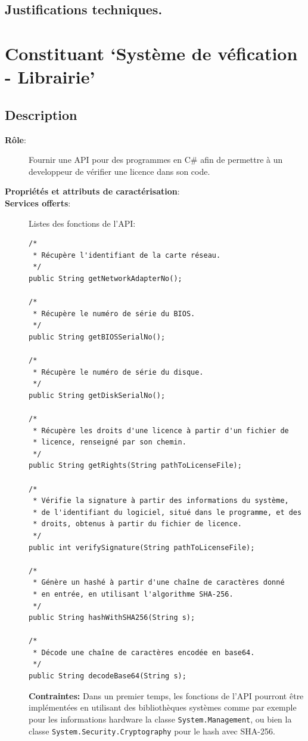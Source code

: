 \subsection{Justifications techniques.}

\section{Constituant `Système de véfication - Librairie'}
\subsection{Description}
\begin{description}
	\item[\textbf{Rôle}:]
		Fournir une API pour des programmes en C\# afin de 
		permettre à un developpeur de vérifier une licence dans son code.
	\item[\textbf{Propriétés et attributs de caractérisation}:]

	\newpage

	\item[\textbf{Services offerts}:]
		Listes des fonctions de l'API:
		\begin{verbatim}
/*
 * Récupère l'identifiant de la carte réseau.
 */
public String getNetworkAdapterNo();

/*
 * Récupère le numéro de série du BIOS.
 */
public String getBIOSSerialNo();

/*
 * Récupère le numéro de série du disque.
 */
public String getDiskSerialNo();

/*
 * Récupère les droits d'une licence à partir d'un fichier de
 * licence, renseigné par son chemin.
 */
public String getRights(String pathToLicenseFile);

/*
 * Vérifie la signature à partir des informations du système,
 * de l'identifiant du logiciel, situé dans le programme, et des
 * droits, obtenus à partir du fichier de licence.
 */
public int verifySignature(String pathToLicenseFile);

/*
 * Génère un hashé à partir d'une chaîne de caractères donné
 * en entrée, en utilisant l'algorithme SHA-256.
 */
public String hashWithSHA256(String s);

/*
 * Décode une chaîne de caractères encodée en base64.
 */
public String decodeBase64(String s);
			\end{verbatim}

			\textbf{Contraintes:}\newline
			Dans un premier temps, les fonctions de l'API pourront être implémentées en utilisant des bibliothèques systèmes
			comme par exemple pour les informations hardware la classe \verb:System.Management:, ou bien la classe
			\verb:System.Security.Cryptography: pour le hash avec SHA-256.\\


\end{description}
